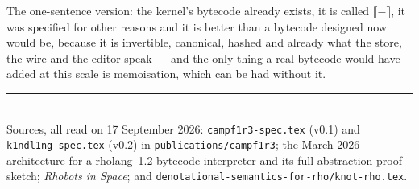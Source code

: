 \documentclass[11pt,a4paper]{article}
\newcommand{\code}[1]{\texttt{#1}}
\newcommand{\enc}[1]{\llbracket #1 \rrbracket}
\theoremstyle{definition}
\theoremstyle{plain}
\begin{document}
\noindent
The one-sentence version: the kernel's bytecode already exists, it is called
$\enc{-}$, it was specified for other reasons and it is better than a bytecode
designed now would be, because it is invertible, canonical, hashed and already
what the store, the wire and the editor speak --- and the only thing a real
bytecode would have added at this scale is memoisation, which can be had
without it.

\bigskip
\noindent\rule{\linewidth}{0.4pt}\\[2pt]
\footnotesize
Sources, all read on 17 September 2026: \code{campf1r3-spec.tex} (v0.1) and
\code{k1ndl1ng-spec.tex} (v0.2) in \code{publications/campf1r3}; the March 2026
architecture for a rholang~1.2 bytecode interpreter and its full abstraction
proof sketch; \emph{Rhobots in Space}; and
\code{denotational-semantics-for-rho/knot-rho.tex}.
\end{document}
